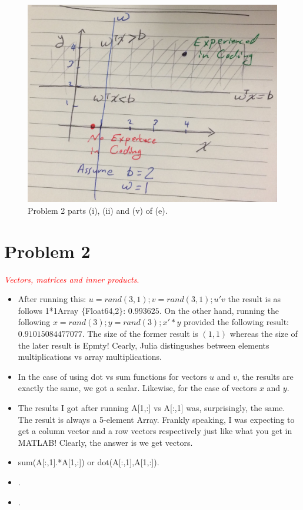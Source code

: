 \documentclass[12pt]{article}
\begin{document}
\begin{figure}[H]
\centering
    \includegraphics[width=400 pt]{IMG_7313.jpg}
    \caption{Problem 2 parts (i), (ii) and (v) of (e).}
    \label{fig:Mat}
\end{figure}
\section{Problem 2}
\textcolor{red}{\textit{Vectors, matrices and inner products}.}\\

\begin{itemize}
\item After running this: $u = rand(3,1);v = rand(3,1); u'v$ the result is as follows 1*1Array $\lbrace$Float64,2$\rbrace$:
 $0.993625$. On the other hand, running the following $x = rand(3); y = rand(3); x'*y$ provided the following result: $0.91015084477077$. The size of the former result is $(1,1)$ whereas the size of the later result is Epmty! Cearly, Julia distingushes between elements multiplications vs array multiplications. 
\item In the case of using dot vs sum functions for vectors $u$ and $v$, the results are exactly the same, we got a scalar. Likewise, for the case of vectors $x$ and $y$. 
\item The results I got after running A[1,:] vs A[:,1] was, surprisingly, the same. The result is always a 5-element Array. Frankly speaking, I was expecting to get a column vector and a row vectors respectively just like what you get in MATLAB! Clearly, the answer is we get vectors.
\item sum(A[:,1].*A[1,:]) or dot(A[:,1],A[1,:]).
\item .
\item .  
\end{itemize}
\end{document}
